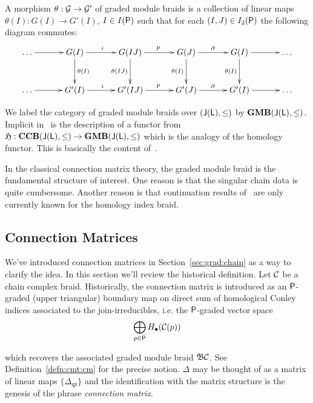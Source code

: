 A morphism $\theta:{\mathcal G}\to {\mathcal G}'$ of graded module braids is a collection of linear maps $\theta(I):G(I)\to G'(I)$, $I\in I({\mathsf P})$ such that for each $(I,J)\in I_2({\mathsf P})$ the following diagram commutes:
\[
\xymatrixrowsep{0.4in}
\xymatrixcolsep{0.45in}
\xymatrix{
\ldots \ar@{->}[r] & G(I) \ar@{->}[d]^{\theta(I)} \ar@{->}[r]^{i} & G(IJ) \ar@{->}[d]_{\theta(IJ)} \ar@{->}[r]^{p} & G(J) \ar@{->}[d]_{\theta(I)} \ar@{->}[r]^{\partial} & G(I) \ar@{->}[d]_{\theta(I)} \ar@{->}[r] & \ldots\\
\ldots \ar@{->}[r] & G'(I) \ar@{->}[r]^{i} & G'(IJ) \ar@{->}[r]^{p} & G'(J) \ar@{->}[r]^{\partial} & G'(I) \ar@{->}[r] &\ldots
}
\]

We label the category of graded module braids over $({\mathsf J}({\mathsf L}),\leq)$ by ${\bf GMB}({\mathsf J}({\mathsf L}),\leq)$.  Implicit in~\cite{fran} is the description of a functor from $\mathfrak{H}:{\bf CCB}({\mathsf J}({\mathsf L}),\leq)\to {\bf GMB}({\mathsf J}({\mathsf L}),\leq)$ which is the analogy of the homology functor.  This is basically the content of~\cite[Proposition 2.7]{fran}.


\begin{rem}
In the classical connection matrix theory, the graded module braid is the fundamental structure of interest.  One reason is that the singular chain data is quite cumbersome.  Another reason is that continuation results of~\cite{fran3}  are only currently known for the homology index braid.
\end{rem}


\subsection{Connection Matrices}

We've introduced connection matrices in Section~\ref{sec:grad:chain} as a way to clarify the idea.  In this section we'll review the historical definition.  Let ${\mathcal C}$ be a chain complex braid.  Historically, the connection matrix is introduced as an ${\mathsf P}$-graded (upper triangular) boundary map on direct sum of homological Conley indices associated to the join-irreducibles, i.e. the ${\mathsf P}$-graded vector space $$\bigoplus_{p\in {\mathsf P}} H_\bullet({\mathcal C}(p))$$

which recovers the associated graded module braid $\mathfrak{B}{\mathcal C}$.  See Definition~\ref{defn:cmt:cm} for the precise notion.   $\Delta$ may be thought of as a matrix of linear maps $\{\Delta_{qp}\}$ and the identification with the matrix structure is the genesis of the phrase {\em connection matrix}.  

